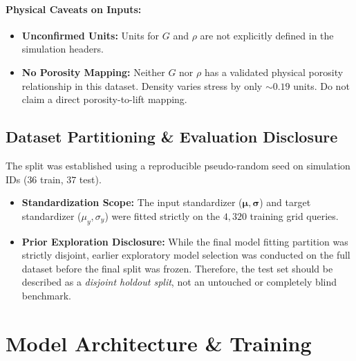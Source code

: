\documentclass[11pt,a4paper]{article}
\begin{document}
\paragraph{Physical Caveats on Inputs:}
\begin{itemize}
    \item \textbf{Unconfirmed Units:} Units for $G$ and $\rho$ are not explicitly defined in the simulation headers.
    \item \textbf{No Porosity Mapping:} Neither $G$ nor $\rho$ has a validated physical porosity relationship in this dataset. Density varies stress by only $\sim 0.19$ units. Do not claim a direct porosity-to-lift mapping.
\end{itemize}

\subsection{Dataset Partitioning \& Evaluation Disclosure}
The split was established using a reproducible pseudo-random seed on simulation IDs ($36$ train, $37$ test).
\begin{itemize}
    \item \textbf{Standardization Scope:} The input standardizer ($\boldsymbol{\mu}, \boldsymbol{\sigma}$) and target standardizer ($\mu_y, \sigma_y$) were fitted strictly on the $4{,}320$ training grid queries.
    \item \textbf{Prior Exploration Disclosure:} While the final model fitting partition was strictly disjoint, earlier exploratory model selection was conducted on the full dataset before the final split was frozen. Therefore, the test set should be described as a \textit{disjoint holdout split}, not an untouched or completely blind benchmark.
\end{itemize}

\section{Model Architecture \& Training}
\end{document}
